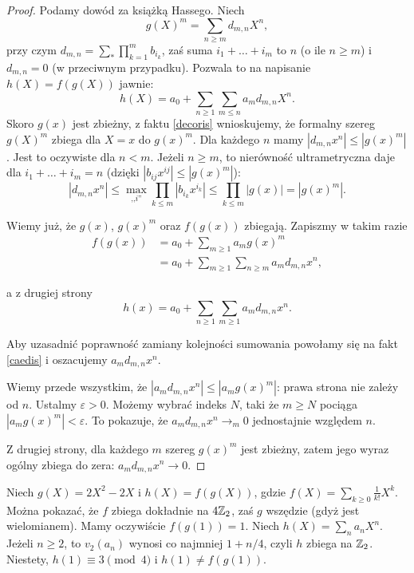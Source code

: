 \begin{proof}
	Podamy dowód za książką Hassego. Niech
	\[
		g(X)^m = \sum_{n \ge m} d_{m,n} X^n,
	\]
	przy czym $d_{m,n} = \sum_* \prod_{k=1}^m b_{i_k}$, zaś suma $i_1 + \ldots + i_m$ to $n$ (o ile $n \ge m$) i $d_{m,n} = 0$ (w przeciwnym przypadku).
	Pozwala to na napisanie $h(X) = f(g(X))$ jawnie:
	\[
		h(X) = a_0 + \sum_{n \ge 1} \sum_{m \le n} a_m d_{m,n} X^n.
	\]
	Skoro $g(x)$ jest zbieżny, z faktu \ref{decoris} wnioskujemy, że formalny szereg $g(X)^m$ zbiega dla $X =x$ do $g(x)^m$.
	Dla każdego $n$ mamy $|d_{m,n}x^n| \le |g(x)^m|$.
	Jest to oczywiste dla $n < m$. Jeżeli $n \ge m$, to nierówność ultrametryczna daje dla $i_1 + \ldots + i_m = n$ (dzięki $|b_{ij} x^{ij}| \le |g(x)^m|$):
	\[
		|d_{m,n}x^n| \le \max_{\mbox{,,}i\mbox{''}} \prod_{k \le m} |b_{i_k} x^{i_k}| \le \prod_{k \le m} |g(x)| = |g(x)^m|.
	\]

	Wiemy już, że $g(x)$, $g(x)^m$ oraz $f(g(x))$ zbiegają.
	Zapiszmy w takim razie
	\begin{align*}
	 	f(g(x)) & = a_0 + \sum_{m \ge 1} a_mg(x)^m \\
	 	& = a_0 + \sum_{m \ge 1} \sum_{n \ge m} a_m d_{m,n}x^n,
	\end{align*}
	
	a z drugiej strony
	\[
		h(x) = a_0 + \sum_{n \ge 1} \sum_{m \ge 1} a_md_{m,n} x^n.
	\]

	Aby uzasadnić poprawność zamiany kolejności sumowania powołamy się na fakt \ref{caedis} i oszacujemy $a_md_{m,n}x^n$.

	Wiemy przede wszystkim, że $|a_md_{m,n}x^n| \le |a_mg(x)^m|$: prawa strona nie zależy od $n$.
	Ustalmy $\varepsilon > 0$.
	Możemy wybrać indeks $N$, taki że $m \ge N$ pociąga $|a_mg(x)^m| < \varepsilon$.
	To pokazuje, że $a_md_{m,n}x^n \to_m 0$ jednostajnie względem $n$.

	Z drugiej strony, dla każdego $m$ szereg $g(x)^m$ jest zbieżny, zatem jego wyraz ogólny zbiega do zera: $a_m d_{m,n}x^n \to 0$.
\end{proof}

\begin{przyklad}
	Niech $g(X) = 2X^2 - 2X$ i $h(X) = f(g(X))$, gdzie $f(X) = \sum_{k \ge 0} \frac{1}{k!} X^k$.
	Można pokazać, że $f$ zbiega dokładnie na $4 \mathbb{Z}_2$, zaś $g$ wszędzie (gdyż jest wielomianem).
	Mamy oczywiście $f(g(1)) = 1$.
	Niech $h(X) = \sum_n a_n X^n$.
	Jeżeli $n \ge 2$, to $v_2(a_n)$ wynosi co najmniej $1 + n / 4$, czyli $h$ zbiega na $\mathbb{Z}_2$.
	Niestety, $h(1) \equiv 3 \pmod {4}$ i $h(1) \neq f(g(1))$.
\end{przyklad}

